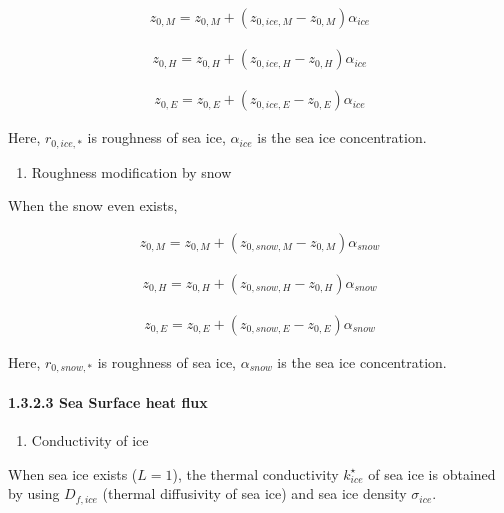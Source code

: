 \begin{eqnarray}
    z_{0,M} = z_{0,M} + ( z_{0,ice,M} - z_{0,M})  \alpha_{ice}
\end{eqnarray}

\begin{eqnarray}
    z_{0,H} = z_{0,H} + ( z_{0,ice,H} - z_{0,H})  \alpha_{ice}
\end{eqnarray}

\begin{eqnarray}
    z_{0,E} = z_{0,E} + ( z_{0,ice,E} - z_{0,E})  \alpha_{ice}
\end{eqnarray}

Here, \(r_{0,ice,*}\) is roughness of sea ice, \(\alpha_{ice}\) is the
sea ice concentration.

\begin{enumerate}
\def\labelenumi{\arabic{enumi}.}
\setcounter{enumi}{2}
\tightlist
\item
  Roughness modification by snow
\end{enumerate}

When the snow even exists,

\begin{eqnarray}
    z_{0,M} = z_{0,M} + ( z_{0,snow,M} - z_{0,M})  \alpha_{snow}
\end{eqnarray}

\begin{eqnarray}
    z_{0,H} = z_{0,H} + ( z_{0,snow,H} - z_{0,H})  \alpha_{snow}
\end{eqnarray}

\begin{eqnarray}
    z_{0,E} = z_{0,E} + ( z_{0,snow,E} - z_{0,E})  \alpha_{snow}
\end{eqnarray}

Here, \(r_{0,snow,*}\) is roughness of sea ice, \(\alpha_{snow}\) is the
sea ice concentration.

\hypertarget{sea-surface-heat-flux}{%
\paragraph{1.3.2.3 Sea Surface heat flux}\label{sea-surface-heat-flux}}

\begin{enumerate}
\def\labelenumi{\arabic{enumi}.}
\tightlist
\item
  Conductivity of ice
\end{enumerate}

When sea ice exists (\(L=1\)), the thermal conductivity
\(k_{ice}^\star\) of sea ice is obtained by using \(D_{f,ice}\) (thermal
diffusivity of sea ice) and sea ice density \(\sigma_{ice}\).

